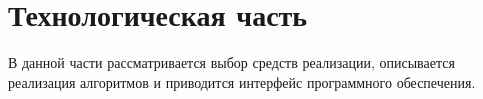 \chapter{Технологическая часть}
В данной части рассматривается выбор средств реализации, описывается реализация алгоритмов и приводится интерфейс программного
обеспечения.

